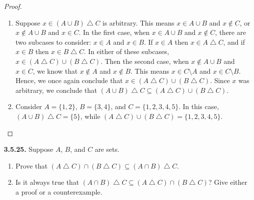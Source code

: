 \documentclass[12pt]{amsart}
\newenvironment{statement}[1]{\smallskip\noindent\color[rgb]{.6627, .3529, .6314} {\bf #1.}}{}
\theoremstyle{definition}
\theoremstyle{remark}
\begin{document}
\begin{proof}
\hfill
\begin{enumerate}
	\item Suppose $x \in (A \cup B) \bigtriangleup C$ is arbitrary.
	This means $x \in A \cup B$ and $x \notin C$, or $x \notin A \cup B$ and $x \in C$.
	In the first case, when $x \in A \cup B$ and $x \notin C$, there are two subcases to consider:
	$x \in A$ and $x \in B$.
	If $x \in A$ then $x \in A \bigtriangleup C$, and if $x \in B$ then $x \in B \bigtriangleup C$.
	In either of these subcases, $x \in (A \bigtriangleup C) \cup (B \bigtriangleup C)$.
	Then the second case, when $x \notin A \cup B$ and $x \in C$, we know that
	$x \notin A$ and $x \notin B$.
	This means $x \in C \setminus A$ and $x \in C \setminus B$.
	Hence, we once again conclude that $x \in (A \bigtriangleup C) \cup (B \bigtriangleup C)$.
	Since $x$ was arbitrary, we conclude that $(A \cup B) \bigtriangleup C \subseteq
	(A \bigtriangleup C) \cup (B \bigtriangleup C)$.
	
	\item Consider $A = \{ 1, 2 \}$, $B = \{ 3, 4 \}$, and $C = \{ 1, 2, 3, 4, 5 \}$.
	In this case, $(A \cup B) \bigtriangleup C = \{ 5 \}$, while
	$(A \bigtriangleup C) \cup (B \bigtriangleup C) = \{ 1, 2, 3, 4, 5 \}$.
\end{enumerate}
\end{proof}


\begin{statement}{3.5.25}
Suppose $A$, $B$, and $C$ are sets.
\begin{enumerate}
	\item Prove that $(A \bigtriangleup C) \cap (B \bigtriangleup C) \subseteq
	(A \cap B) \bigtriangleup C$.
	
	\item Is it always true that $(A \cap B) \bigtriangleup C \subseteq
	(A \bigtriangleup C) \cap (B \bigtriangleup C)$?
	Give either a proof or a counterexample.
\end{enumerate}
\end{statement}
\end{document}
